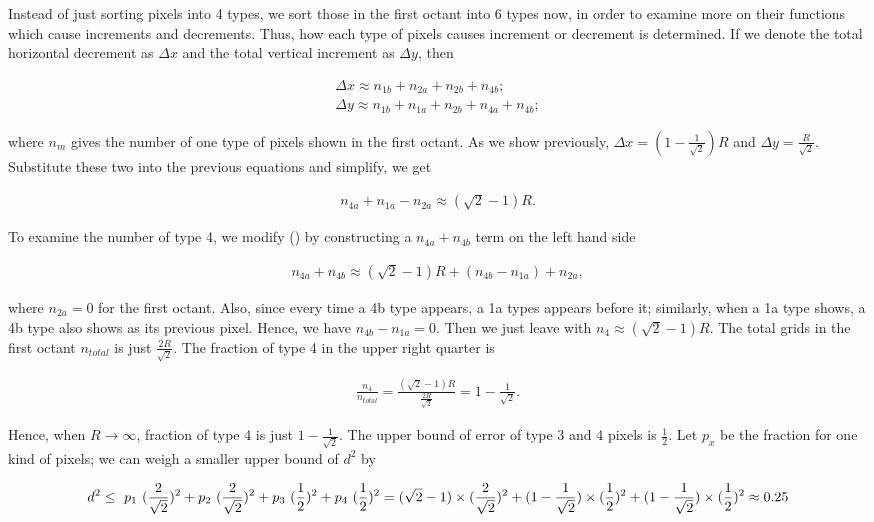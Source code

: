 \documentclass[letterpaper]{article}
\numberwithin{equation}{section} %
\numberwithin{figure}{section} %
\numberwithin{table}{section} %
\begin{document}
Instead of just sorting pixels into 4 types, we sort those in the first octant into 6 types now, in order to examine more on their functions which cause increments and decrements. Thus, how each type of pixels causes increment or decrement is determined. If we denote the total horizontal decrement as $\Delta x$ and the total vertical increment as $\Delta y$, then

\begin{align} 
\Delta x \approx n_{1b}+n_{2a}+n_{2b}+n_{4b}; \\
\Delta y \approx n_{1b}+n_{1a}+n_{2b}+n_{4a}+n_{4b};
\end{align}

\noindent
where $n_{m}$ gives the number of one type of pixels shown in the first octant. As we show previously, $\Delta x=(1-\frac{1}{\sqrt{2}})R$ and $\Delta y=\frac{R}{\sqrt{2}}$. Substitute these two into the previous equations and simplify, we get

\begin{align} 
n_{4a}+n_{1a}-n_{2a} \approx (\sqrt{2}-1)R.
\end{align}

\noindent
To examine the number of type 4, we modify () by constructing a $n_{4a}+n_{4b}$ term on the left hand side

\begin{align} 
n_{4a}+n_{4b} \approx (\sqrt{2}-1)R+(n_{4b}-n_{1a})+n_{2a},
\end{align}

\noindent
where $n_{2a}=0$ for the first octant. Also, since every time a 4b type appears, a 1a types appears before it; similarly, when a 1a type shows, a 4b type also shows as its previous pixel. Hence, we have $n_{4b}-n_{1a}=0$. Then we just leave with $n_{4} \approx (\sqrt{2}-1)R$. The total grids in the first octant $n_{total}$ is just $\frac{2R}{\sqrt{2}}$. The fraction of type 4 in the upper right quarter is

\begin{align} 
\frac{n_{4}}{n_{total}} = \frac{(\sqrt{2}-1)R}{\frac{2R}{\sqrt{2}}} = 1-\frac{1}{\sqrt{2}}.
\end{align}

\noindent
Hence, when $R \rightarrow \infty$, fraction of type 4 is just $1-\frac{1}{\sqrt{2}}$. The upper bound of error of type 3 and 4 pixels is $\frac{1}{2}$. Let $p_x$ be the fraction for one kind of pixels; we can weigh a smaller upper bound of $d^2$ by 

\begin{equation}
d^2 \leq  \ p_1 \ (\frac{2}{\sqrt{2}})^2 + p_2 \ (\frac{2}{\sqrt{2}})^2 + p_3 \ (\frac{1}{2})^2 + p_4 \ (\frac{1}{2})^2 \\
 = (\sqrt{2}-1) \times (\frac{2}{\sqrt{2}})^2 + (1-\frac{1}{\sqrt{2}}) \times (\frac{1}{2})^2 + (1-\frac{1}{\sqrt{2}}) \times (\frac{1}{2})^2 \\
 \approx 0.25
\end{equation}
\end{document}
